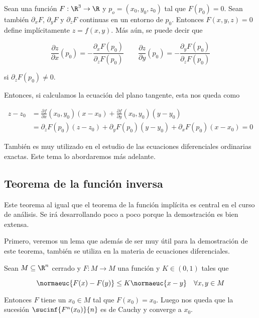 \begin{ejem}
    Sean una función $F: \R^3 \rightarrow \R$ y $p_o = (x_0, y_0, z_0)$ tal que $F(p_0) = 0$. Sean también $\partial_xF$, $\partial_yF$ y $\partial_zF$ continuas en un entorno de $p_0$. Entonces $F(x,y,z) = 0$ define implícitamente $z = f(x,y)$. Más aún, se puede decir que
    
    \[
    \frac{\partial z}{\partial x}(p_0) = - \frac{\partial_xF(p_0)}{\partial_zF(p_0)}
    \qquad
    \frac{\partial z}{\partial y}(p_0) = - \frac{\partial_yF(p_0)}{\partial_zF(p_0)}
    \]
    
    \noindent si $\partial_zF(p_0) \neq 0$.
    
    Entonces, si calculamos la ecuación del plano tangente, esta nos queda como
    
    \begin{align*}
        z - z_0 &= \frac{\partial f}{\partial x}(x_0,y_0)(x-x_0) + \frac{\partial f}{\partial y}(x_0,y_0)(y-y_0) \\
            &= \partial_zF(p_0)(z-z_0) + \partial_yF(p_0)(y-y_0) + \partial_xF(p_0)(x-x_0) = 0
    \end{align*}
\end{ejem}

\begin{ejem}
    También es muy utilizado en el estudio de las ecuaciones diferenciales ordinarias exactas. Este tema lo abordaremos más adelante.
\end{ejem}

\subsection{Teorema de la función inversa}

Este teorema al igual que el teorema de la función implícita es central en el curso de análisis. Se irá desarrollando poco a poco porque la demostración es bien extensa.

Primero, veremos un lema que además de ser muy útil para la demostración de este teorema, también se utiliza en la materia de ecuaciones diferenciales.

\begin{lem}
    Sean $M \subseteq \R^n$ cerrado y $F: M \rightarrow M$ una función y $K \in (0,1)$ tales que
    
    \[
    \normaeuc{F(x) - F(y)} \leq K\normaeuc{x - y} \quad \forall x,y \in M
    \]
    
    Entonces $F$ tiene un $x_0 \in M$ tal que $F(x_0) = x_0$. Luego nos queda que la sucesión $\sucinf{F^n(x_0)}{n}$ es de Cauchy y converge a $x_0$.
\end{lem}

